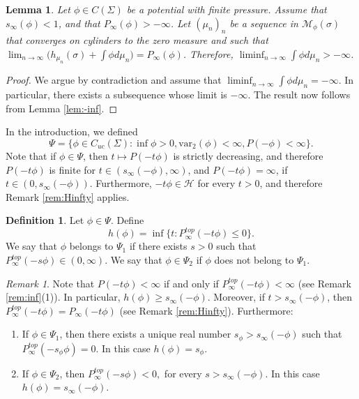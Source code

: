 \documentclass[letterpaper,11pt]{amsart}
\theoremstyle{plain}
\theoremstyle{plain}
\newtheorem{lemma}[proposition]{Lemma}
\theoremstyle{definition}
\newtheorem{definition}{Definition}[subsection]
\theoremstyle{remark}
\newtheorem{remark}{Remark}[section]
\def\M{{\mathcal M}}
\def\H{{\mathcal H}}
\begin{document}
\begin{lemma}\label{prop:gapr} Let $\phi\in C(\Sigma)$ be a potential with finite pressure. Assume that $s_\infty(\phi)<1$, and that $P_\infty(\phi)>-\infty$. Let $(\mu_n)_n$ be a sequence in $\M_\phi(\sigma)$ that converges on cylinders to the zero measure and such that $\lim_{n\to\infty}\big(h_{\mu_n}(\sigma)+\int \phi d\mu_n\big)=P_\infty(\phi)$. Therefore, $\liminf_{n\to\infty}\int \phi d\mu_n>-\infty$.
\end{lemma}
\begin{proof} We argue by contradiction and assume that $\liminf_{n\to\infty}\int \phi d\mu_n=-\infty$. In particular, there exists a subsequence whose limit is $-\infty$. The result now follows from Lemma \ref{lem:-inf}.
\end{proof}

In the introduction, we defined  $$\Psi=\{\phi\in C_{uc}(\Sigma): \inf \phi>0, \text{var}_2(\phi)<\infty, P(-\phi)<\infty\}.$$
Note that if $\phi\in\Psi$, then $t\mapsto P(-t\phi)$ is  strictly decreasing, and therefore $P(-t\phi)$ is finite for  $t\in (s_\infty(-\phi),\infty)$, and $P(-t\phi)=\infty$, if $t\in (0,s_\infty(-\phi))$. Furthermore, $-t\phi\in \H$ for every $t>0$, and therefore Remark \ref{rem:Hinfty} applies.

\begin{definition}\label{def:123} Let $\phi \in \Psi$. Define $$h(\phi)=\inf\{t:P^{top}_\infty(-t\phi)\le 0\}.$$ We say that $\phi $ belongs to $\Psi_1$ if there exists $s>0$ such that $P^{top}_\infty(-s\phi)\in (0,\infty)$. We say that $\phi\in \Psi_2$ if $\phi$ does not belong to $\Psi_1$. 
\end{definition}

\begin{remark}\label{rem:inutil} Note that $P(-t\phi)<\infty$  if and only if $P_\infty^{top}(-t\phi)<\infty$ (see Remark \ref{rem:inf}(1)). In particular, $h(\phi)\ge s_\infty(-\phi)$. Moreover, if $t>s_\infty(-\phi)$, then $P_\infty^{top}(-t\phi)=P_\infty(-t\phi)$ (see Remark \ref{rem:Hinfty}). Furthermore:
\begin{enumerate}
\item If $\phi\in \Psi_1$, then there exists a unique real number $s_\phi>s_\infty(-\phi)$ such that \\ $P^{top}_\infty(-s_\phi\phi)=0$. In this case $h(\phi)=s_\phi$. 
\item If $\phi\in \Psi_2$, then $P^{top}_\infty(-s\phi)<0,$ for every $s> s_\infty(-\phi)$. In this case $h(\phi)=s_\infty(-\phi)$.
\end{enumerate}
\end{remark}
\end{document}
